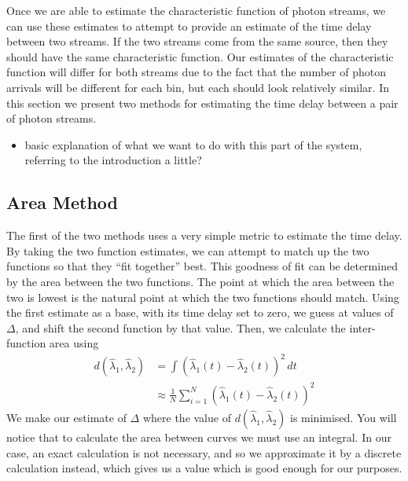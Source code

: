 \documentclass[a4paper,11pt]{article}
\begin{document}
Once we are able to estimate the characteristic function of photon streams, we
can use these estimates to attempt to provide an estimate of the time delay
between two streams. If the two streams come from the same source, then they
should have the same characteristic function. Our estimates of the
characteristic function will differ for both streams due to the fact that the
number of photon arrivals will be different for each bin, but each should look
relatively similar. In this section we present two methods for estimating the
time delay between a pair of photon streams.
\begin{itemize}
\item basic explanation of what we want to do with this part of the system,
  referring to the introduction a little?
\end{itemize}
\subsection{Area Method}
\label{sec-5-1}

The first of the two methods uses a very simple metric to estimate the time
delay. By taking the two function estimates, we can attempt to match up the two
functions so that they ``fit together'' best. This goodness of fit can be
determined by the area between the two functions. The point at which the area
between the two is lowest is the natural point at which the two functions should
match. Using the first estimate as a base, with its time delay set to zero, we
guess at values of $\Delta$, and shift the second function by that value. Then,
we calculate the inter-function area using
    \begin{align}
      d(\hat{\lambda}_1,\hat{\lambda}_2)&=\int(\hat{\lambda}_1(t)-\hat{\lambda}_2(t))^2\,dt\\
      &\approx\frac{1}{N}\sum_{i=1}^N(\hat{\lambda}_1(t)-\hat{\lambda}_2(t))^2
    \end{align}
We make our estimate of $\Delta$ where the value of
$d(\hat{\lambda}_1,\hat{\lambda}_2)$ is minimised. You will notice that to
calculate the area between curves we must use an integral. In our case, an exact
calculation is not necessary, and so we approximate it by a discrete calculation
instead, which gives us a value which is good enough for our purposes.
      
\end{document}
